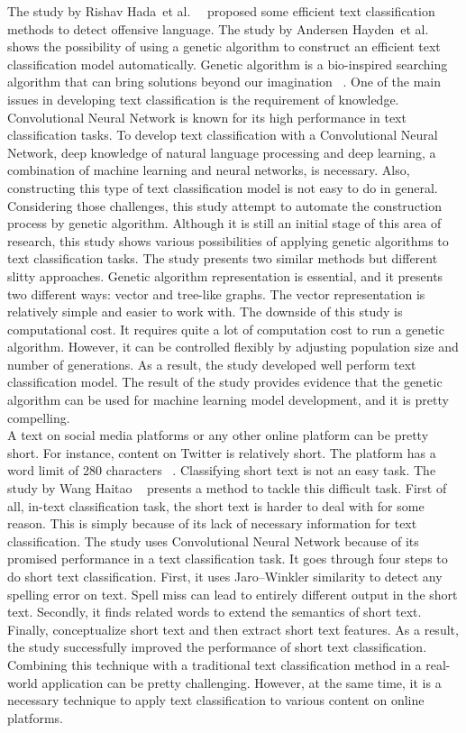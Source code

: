 \documentclass[12pt, natbib=false]{article}
\begin{document}
The study by Rishav Hada et al. ~\cite{hada2021ruddit} proposed some efficient text classification methods to detect offensive language. The study by Andersen Hayden et al. ~\cite{andersen2021evolving} shows the possibility of using a genetic algorithm to construct an efficient text classification model automatically. Genetic algorithm is a bio-inspired searching algorithm that can bring solutions beyond our imagination ~\cite{lehman2020surprising}. One of the main issues in developing text classification is the requirement of knowledge. Convolutional Neural Network is known for its high performance in text classification tasks. To develop text classification with a Convolutional Neural Network, deep knowledge of natural language processing and deep learning, a combination of machine learning and neural networks, is necessary. Also, constructing this type of text classification model is not easy to do in general. Considering those challenges, this study attempt to automate the construction process by genetic algorithm. Although it is still an initial stage of this area of research, this study shows various possibilities of applying genetic algorithms to text classification tasks. The study presents two similar methods but different slitty approaches. Genetic algorithm representation is essential, and it presents two different ways: vector and tree-like graphs. The vector representation is relatively simple and easier to work with. The downside of this study is computational cost. It requires quite a lot of computation cost to run a genetic algorithm. However, it can be controlled flexibly by adjusting population size and number of generations. As a result, the study developed well perform text classification model. The result of the study provides evidence that the genetic algorithm can be used for machine learning model development, and it is pretty compelling. \\
A text on social media platforms or any other online platform can be pretty short. For instance, content on Twitter is relatively short. The platform has a word limit of 280 characters ~\cite{twitter}. Classifying short text is not an easy task. The study by Wang Haitao ~\cite{wang2021short} presents a method to tackle this difficult task. First of all, in-text classification task, the short text is harder to deal with for some reason. This is simply because of its lack of necessary information for text classification. The study uses Convolutional Neural Network because of its promised performance in a text classification task. It goes through four steps to do short text classification. First, it uses Jaro–Winkler similarity to detect any spelling error on text. Spell miss can lead to entirely different output in the short text. Secondly, it finds related words to extend the semantics of short text. Finally, conceptualize short text and then extract short text features. As a result, the study successfully improved the performance of short text classification. Combining this technique with a traditional text classification method in a real-world application can be pretty challenging. However, at the same time, it is a necessary technique to apply text classification to various content on online platforms. \\
\end{document}
